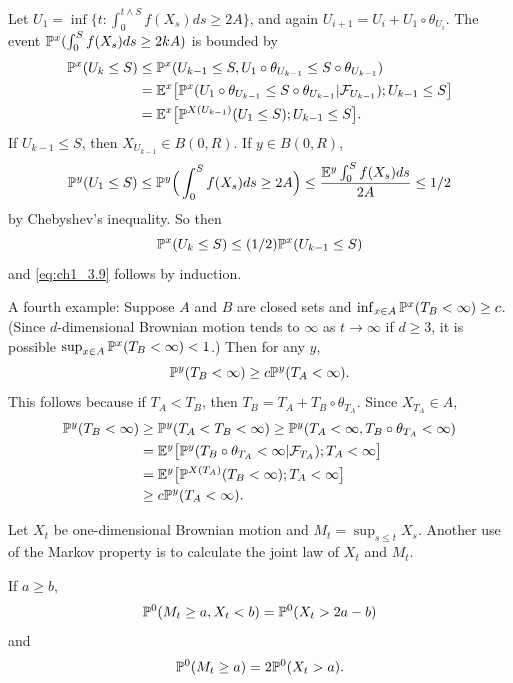 Let $U_1 = \inf\{t : \int_0^{t\wedge S} f(X_s)ds \geq 2A\}$, and again $U_{i+1} = U_i + U_1 \circ \theta_{U_i}$. The event $\P^x(\int_0^S f(X_s)ds \geq 2kA)$ is bounded by
\begin{align*}
    \P^x(U_k \leq S) &\leq \P^x(U_{k-1} \leq S, U_1 \circ \theta_{U_{k-1}} \leq S \circ \theta_{U_{k-1}}) \\
    &= \E^x\big[\P^x(U_1 \circ \theta_{U_{k-1}} \leq S \circ \theta_{U_{k-1}}\mid \FC_{U_{k-1}});U_{k-1} \leq S\big] \\
    &= \E^x\big[\P^{X(U_{k-1})}(U_1 \leq S);U_{k-1} \leq S\big].
\end{align*}
If $U_{k-1} \leq S$, then $X_{U_{k-1}} \in B(0,R)$. If $y \in B(0,R)$,
\mpagebreak
\begin{align*}
    \P^y(U_1 \leq S) \leq \P^y\Big(\int_0^S f(X_s)ds \geq 2A\Big) \leq \frac{\E^y \int_0^S f(X_s)ds}{2A} \leq 1/2
\end{align*}
by Chebyshev's inequality. So then
\[
    \P^x(U_k \leq S) \leq (1/2)\P^x(U_{k-1} \leq S)
\]
and \eqref{eq:ch1_3.9} follows by induction.

A fourth example: \hspace{-0.1em}Suppose $A$ and $B$ are closed sets and $\inf_{x\in A} \P^x(T_B<\allowbreak\infty) \geq c$. (Since $d$-dimensional Brownian motion tends to $\infty$ as $t \to \infty$ if $d \geq 3$, it is possible $\sup_{x\in A} \P^x(T_B < \infty) < 1$.) Then for any $y$,
\[
    \P^y(T_B < \infty) \geq c\P^y(T_A < \infty).
\]
This follows because if $T_A < T_B$, then $T_B = T_A + T_B \circ \theta_{T_A}$. Since $X_{T_A} \in A$,
\begin{align*}
    \P^y(T_B < \infty) &\geq \P^y(T_A < T_B < \infty) \geq \P^y(T_A < \infty, T_B \circ \theta_{T_A} < \infty) \\
    &= \E^y\big[\P^y(T_B \circ \theta_{T_A} < \infty\mid \FC_{T_A}); T_A < \infty\big] \\
    &= \E^y\big[\P^{X(T_A)}(T_B < \infty); T_A < \infty\big] \\
    &\geq c\P^y(T_A < \infty).
\end{align*}


Let $X_t$ be one-dimensional Brownian motion and $M_t = \sup_{s\leq t} X_s$. Another use of the Markov property is to calculate the joint law of $X_t$ and $M_t$.


\begin{theorem}\label{thm:ch1_3.8}
If $a \geq b$,
\begin{equation}\label{eq:ch1_3.10}
    \P^0(M_t \geq a, X_t < b) = \P^0(X_t > 2a - b)
\end{equation}
and
\begin{equation}\label{eq:ch1_3.11}
    \P^0(M_t \geq a) = 2\P^0(X_t > a).
\end{equation}
\end{theorem}

